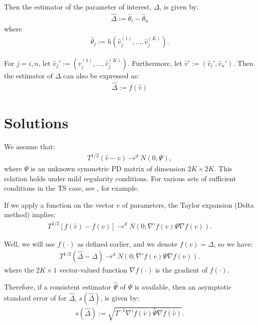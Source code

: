 \documentclass[12pt,oneside,a4paper]{article}
\begin{document}
Then the estimator of the parameter of interest, $\Delta$, is given by:
\begin{align}
	\hat{\Delta} := \hat{\theta}_{i} - \hat{\theta}_{n}
\end{align}
where
\begin{align}
	\hat{\theta}_{j} := h(\hat{v}_{j}^{(1)}, \dots, \hat{v}_{j}^{(K)} ).
\end{align}

For $j=i,n$, let $\hat{v}_{j}' := (\hat{v}_{j}^{(1)}, \dots, \hat{v}_{j}^{(K)} )$.
Furthermore, let $\hat{v}' :=( \hat{v}_{i}', \hat{v}_{n}' )$.
Then the estimator of $\Delta$ can also be expressed as:
\begin{align*}
	\hat{\Delta} := f(\hat{v})
\end{align*}

\section{Solutions}
We assume that:
\begin{align}\label{eq:vhat:dist}
	T^{1/2}(\hat{v} - v) \to^d N(0, \Psi),
\end{align}
where $\Psi$ is an unknown symmetric PD matrix of dimension $2K \times 2K$.
This relation holds under mild regularity conditions.
For various sets of sufficient conditions in the TS case, see , for example.

If we apply a function on the vector $v$ of parameters, the Taylor expansion (Delta method) implies:
\begin{align*}
T^{1/2}[f(\hat{v}) - f(v)] \to^d N \left( 0; \nabla'f(v) \Psi \nabla f(v)  \right).
\end{align*}

Well, we will use $f(\cdot)$ as defined earlier, and we denote $f(v) = \Delta$, so we have:
\begin{align}\label{eq:dhat:dist}
	T^{1/2}(\hat{\Delta} - \Delta) 	\to^d N \left( 0; \nabla'f(v) \Psi \nabla f(v)  \right).
\end{align}
where the $2K \times 1$ vector-valued function $\nabla f(\cdot)$ is the gradient of $f(\cdot)$. 

Therefore, if a consistent estimator $\hat{\Psi}$ of $\Psi$ is available, then an asymptotic standard error of for $\hat{\Delta}$, $s(\hat{\Delta})$, is given by:
\begin{align}\label{eq:sedelta}
s(\hat{\Delta}) := \sqrt{T^{-1} \nabla'f(\hat{v}) \hat{\Psi} \nabla f(\hat{v})}.
\end{align}
\end{document}
